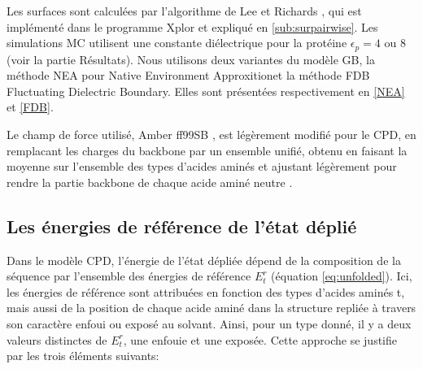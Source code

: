 Les surfaces sont calculées par l'algorithme de Lee et Richards \cite{Lee71},  qui est implémenté dans le programme Xplor \cite{Xplor} et expliqué en \ref{sub:surpairwise}. Les simulations MC utilisent une constante diélectrique pour la protéine $\epsilon_p = 4$ ou $8$ (voir la partie Résultats).
Nous utilisons deux variantes du modèle  GB, la méthode NEA pour \og Native Environment Approxition\fg et la méthode FDB \og Fluctuating Dielectric Boundary\fg \cite{Villa17}. Elles sont présentées respectivement en \ref{NEA} et \ref{FDB}.

Le champ de force utilisé, Amber ff99SB \cite{Cornell95}, est légèrement modifié pour le CPD, en remplacant les charges du backbone par un ensemble unifié, obtenu en faisant la moyenne sur l'ensemble des types d'acides aminés et ajustant légèrement pour rendre la partie backbone de chaque acide aminé neutre \cite{Aleksandrov10}.

\subsection{Les énergies de référence de l'état déplié}

Dans le modèle CPD, l'énergie de l'état dépliée dépend de la composition de la séquence par l'ensemble des énergies de référence $E^r_t$ (équation \ref{eq:unfolded}). Ici, les énergies de référence sont attribuées en fonction des types d'acides aminés t, mais aussi de la position de chaque acide aminé dans la structure repliée à travers son caractère enfoui ou exposé au solvant. Ainsi, pour un type donné, il y a deux valeurs distinctes de $E^r_t$, une enfouie et une exposée. Cette approche se justifie par les trois éléments suivants:

